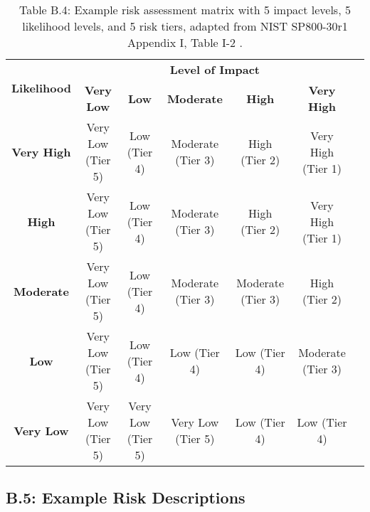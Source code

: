 \documentclass[fleqn]{article}
\begin{document}
\begin{table}[H]
    \caption*{Table B.4: Example risk assessment matrix with 5 impact levels, 5 likelihood levels, and 5 risk tiers, adapted from NIST SP800-30r1 Appendix I, Table I-2 \cite{nist80030r1}.}
    \small
    \begin{tabular}{|c|c|c|c|c|c|c|}
        \hline
        \multirow{2}{*}{\textbf{Likelihood}} & \multicolumn{5}{|c|}{\textbf{Level of Impact}}   \\
        \cline{2-6}
        & \textbf{Very Low} & \textbf{Low} & \textbf{Moderate} & \textbf{High} & \textbf{Very High} \\
        \hline
        \textbf{Very High} & Very Low (Tier 5) & Low (Tier 4) & Moderate (Tier 3) & High (Tier 2) & Very High 
        (Tier 1) \\
        \hline		
        \textbf{High} & Very Low (Tier 5) & Low (Tier 4) & Moderate (Tier 3)  & High (Tier 2) & Very High (Tier 1) \\
        \hline
        \textbf{Moderate} & Very Low (Tier 5) & Low (Tier 4) & Moderate (Tier 3)  & Moderate (Tier 3) & High (Tier 2) \\
        \hline
        \textbf{Low} & Very Low (Tier 5) & Low (Tier 4) & Low (Tier 4)  & Low (Tier 4) & Moderate (Tier 3) \\
        \hline
        \textbf{Very Low} & Very Low (Tier 5) & Very Low (Tier 5) & Very Low (Tier 5) & Low (Tier 4) & Low (Tier 4) \\
        \hline
    \end{tabular}
    \label{table:nist_risk_tiers}
\end{table}

\subsection*{B.5: Example Risk Descriptions}
\end{document}
